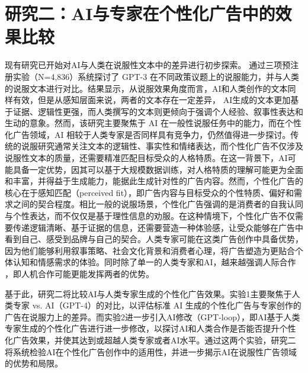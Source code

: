 \chapter{研究二：AI与专家在个性化广告中的效果比较}

现有研究已开始对AI与人类在说服性文本中的差异进行初步探索。\citet{bai2023artificial} 通过三项预注册实验（N=4,836）系统探讨了 GPT-3 在不同政策议题上的说服能力，并与人类的说服文本进行对比。结果显示，从说服效果角度而言，AI和人类创作的文本同样有效，但是从感知层面来说，两者的文本存在一定差异， AI生成的文本更加基于证据、逻辑性更强，而人类撰写的文本则更倾向于强调个人经验、叙事性表达和生动的意象。然而，该研究主要聚焦于 AI 在一般性说服任务中的能力，而在个性化广告领域，AI 相较于人类专家是否同样具有竞争力，仍然值得进一步探讨。传统的说服研究通常关注文本的逻辑性、事实性和情绪表达，而个性化广告不仅涉及说服性文本的质量，还需要精准匹配目标受众的人格特质。在这一背景下，AI可能具备一定优势，因其可以基于大规模数据训练，对人格特质的理解可能更为全面和丰富，并得益于生成能力，能据此生成针对性的广告内容。然而，个性化广告的核心在于感知匹配（perceived fit），即广告内容与目标受众的个性特质、偏好和需求之间的契合程度\citep{wheeler2005self}。相比一般的说服场景，个性化广告强调的是消费者的自我认同与个性表达，而不仅仅是基于理性信息的劝服。在这种情境下，个性化广告不仅需要传递逻辑清晰、基于证据的信息，还需要营造一种体验感，让受众能够在广告中看到自己、感受到品牌与自己的契合\citep{phillips1997thinking}。人类专家可能在这类广告创作中具备优势，因为他们能够利用叙事策略、社会文化背景和消费者心理，将广告塑造为更贴合个体认知和情感需求的体验。同时除了单一的人类专家和AI，越来越强调人际合作 \citep{karinshak2023working}，即人机合作可能更能发挥两者的优势。

基于此，研究二将比较AI与人类专家生成的个性化广告效果。实验1主要聚焦于人类专家 vs. AI（GPT-4）的对比，以评估标准 AI 生成的个性化广告与专家创作的广告在说服力上的差异。而实验2进一步引入AI修改（GPT-loop），即AI基于人类专家生成的个性化广告进行进一步修改，以探讨AI和人类合作是否能否提升个性化广告效果，并使其达到或超越人类专家或者AI水平。通过这两个实验，研究二将系统检验AI在个性化广告创作中的适用性，并进一步揭示AI在说服性广告领域的优势和局限。






